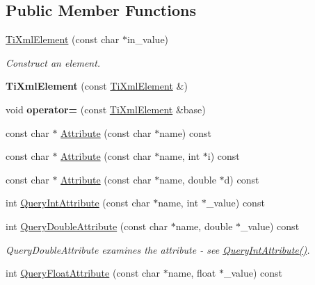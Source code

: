 \subsection*{\-Public \-Member \-Functions}
\begin{DoxyCompactItemize}
\item 
\hypertarget{classTiXmlElement_a01bc3ab372d35da08efcbbe65ad90c60}{
\hyperlink{classTiXmlElement_a01bc3ab372d35da08efcbbe65ad90c60}{\-Ti\-Xml\-Element} (const char $\ast$in\-\_\-value)}
\label{db/d59/classTiXmlElement_a01bc3ab372d35da08efcbbe65ad90c60}

\begin{DoxyCompactList}\small\item\em \-Construct an element. \end{DoxyCompactList}\item 
\hypertarget{classTiXmlElement_a1ca4465f3c2eac6a60e641cd7f1d9f7e}{
{\bfseries \-Ti\-Xml\-Element} (const \hyperlink{classTiXmlElement}{\-Ti\-Xml\-Element} \&)}
\label{db/d59/classTiXmlElement_a1ca4465f3c2eac6a60e641cd7f1d9f7e}

\item 
\hypertarget{classTiXmlElement_af5cd4156e082ef3bf23adfe0ed173340}{
void {\bfseries operator=} (const \hyperlink{classTiXmlElement}{\-Ti\-Xml\-Element} \&base)}
\label{db/d59/classTiXmlElement_af5cd4156e082ef3bf23adfe0ed173340}

\item 
const char $\ast$ \hyperlink{classTiXmlElement_ac1e4691e9375ba4e665dce7e46a50a9c}{\-Attribute} (const char $\ast$name) const 
\item 
const char $\ast$ \hyperlink{classTiXmlElement_aa9192e80567b5042dbded80b78c44339}{\-Attribute} (const char $\ast$name, int $\ast$i) const 
\item 
const char $\ast$ \hyperlink{classTiXmlElement_aec4f727f8aa49b51248d80125d173136}{\-Attribute} (const char $\ast$name, double $\ast$d) const 
\item 
int \hyperlink{classTiXmlElement_aea0bfe471380f281c5945770ddbf52b9}{\-Query\-Int\-Attribute} (const char $\ast$name, int $\ast$\-\_\-value) const 
\item 
\hypertarget{classTiXmlElement_a898d7730ecc341f0bffc7a9dadbf1ce7}{
int \hyperlink{classTiXmlElement_a898d7730ecc341f0bffc7a9dadbf1ce7}{\-Query\-Double\-Attribute} (const char $\ast$name, double $\ast$\-\_\-value) const }
\label{db/d59/classTiXmlElement_a898d7730ecc341f0bffc7a9dadbf1ce7}

\begin{DoxyCompactList}\small\item\em \-Query\-Double\-Attribute examines the attribute -\/ see \hyperlink{classTiXmlElement_aea0bfe471380f281c5945770ddbf52b9}{\-Query\-Int\-Attribute()}. \end{DoxyCompactList}\item 
\hypertarget{classTiXmlElement_aa04d3af11601ef5a5f88295203a843be}{
int \hyperlink{classTiXmlElement_aa04d3af11601ef5a5f88295203a843be}{\-Query\-Float\-Attribute} (const char $\ast$name, float $\ast$\-\_\-value) const }
\label{db/d59/classTiXmlElement_aa04d3af11601ef5a5f88295203a843be}


\end{DoxyCompactItemize}
